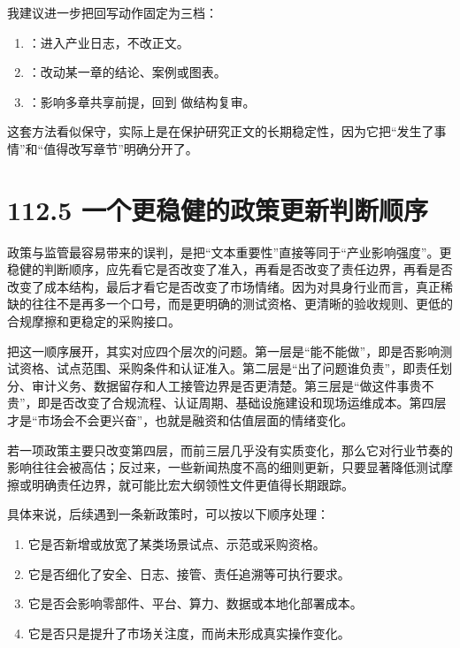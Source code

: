 我建议进一步把回写动作固定为三档：

\begin{enumerate}
\item \texttt{}：进入产业日志，不改正文。
\item \texttt{}：改动某一章的结论、案例或图表。
\item \texttt{}：影响多章共享前提，回到  做结构复审。
\end{enumerate}

这套方法看似保守，实际上是在保护研究正文的长期稳定性，因为它把“发生了事情”和“值得改写章节”明确分开了。

\section*{112.5 一个更稳健的政策更新判断顺序}


政策与监管最容易带来的误判，是把“文本重要性”直接等同于“产业影响强度”。更稳健的判断顺序，应先看它是否改变了准入，再看是否改变了责任边界，再看是否改变了成本结构，最后才看它是否改变了市场情绪。因为对具身行业而言，真正稀缺的往往不是再多一个口号，而是更明确的测试资格、更清晰的验收规则、更低的合规摩擦和更稳定的采购接口。

把这一顺序展开，其实对应四个层次的问题。第一层是“能不能做”，即是否影响测试资格、试点范围、采购条件和认证准入。第二层是“出了问题谁负责”，即责任划分、审计义务、数据留存和人工接管边界是否更清楚。第三层是“做这件事贵不贵”，即是否改变了合规流程、认证周期、基础设施建设和现场运维成本。第四层才是“市场会不会更兴奋”，也就是融资和估值层面的情绪变化。

若一项政策主要只改变第四层，而前三层几乎没有实质变化，那么它对行业节奏的影响往往会被高估；反过来，一些新闻热度不高的细则更新，只要显著降低测试摩擦或明确责任边界，就可能比宏大纲领性文件更值得长期跟踪。

具体来说，后续遇到一条新政策时，可以按以下顺序处理：

\begin{enumerate}
\item 它是否新增或放宽了某类场景试点、示范或采购资格。
\item 它是否细化了安全、日志、接管、责任追溯等可执行要求。
\item 它是否会影响零部件、平台、算力、数据或本地化部署成本。
\item 它是否只是提升了市场关注度，而尚未形成真实操作变化。
\end{enumerate}

